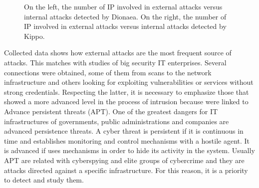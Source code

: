 \documentclass[a4paper]{llncs}
\begin{document}
\begin{figure}[h]
	\label{fig:intvsextDionaea}
	\label{fig:intvsextKippo}
	\caption{On the left, the number of IP involved in external attacks versus internal attacks detected by Dionaea. On the right, the number of IP involved in external attacks versus internal attacks detected by Kippo.}
\end{figure}

Collected data shows how external attacks are the most frequent source of attacks. This matches with studies of big security IT enterprises\cite{verizon-2015}. Several connections were obtained, some of them from scans to the network infrastructure and others looking for exploiting vulnerabilities or services without strong credentials. Respecting the latter, it is necessary to emphasize those that showed a more advanced level in the process of intrusion because were linked to Advance persistent threats (APT). One of the greatest dangers for IT infrastructures of governments, public administrations and companies are advanced persistence threats. A cyber threat is persistent if it is continuous in time and establishes monitoring and control mechanisms with a hostile agent. It is advanced if uses mechanisms in order to hide its activity in the system. Usually APT are related with cyberspying and elite groups of cybercrime and they are attacks directed against a specific infrastructure. For this reason, it is a priority to detect and study them.
\end{document}
